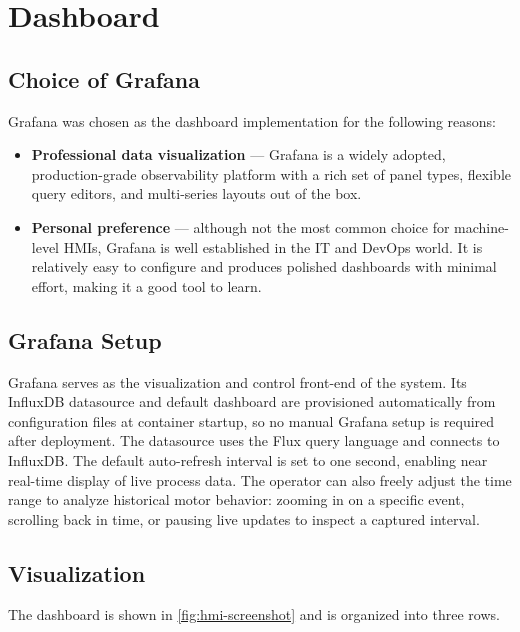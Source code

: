 \documentclass[a4paper,11pt]{article}
\begin{document}
\section{Dashboard}
\label{sec:dashboard}

\subsection{Choice of Grafana}

Grafana was chosen as the dashboard implementation for the following reasons:

\begin{itemize}
    \item \textbf{Professional data visualization} --- Grafana is a widely adopted, production-grade
    observability platform with a rich set of panel types, flexible query editors, and multi-series
    layouts out of the box.
    \item \textbf{Personal preference} --- although not the most common choice for machine-level
    HMIs, Grafana is well established in the IT and DevOps world. It is relatively easy to
    configure and produces polished dashboards with minimal effort, making it a good tool to learn.
\end{itemize}

\subsection{Grafana Setup}

Grafana serves as the visualization and control front-end of the system. Its InfluxDB datasource
and default dashboard are provisioned automatically from configuration files at container startup,
so no manual Grafana setup is required after deployment. The datasource uses the Flux query
language and connects to InfluxDB. The default auto-refresh interval is set to one second, enabling
near real-time display of live process data. The operator can also freely adjust the time range to
analyze historical motor behavior: zooming in on a specific event, scrolling back in time, or
pausing live updates to inspect a captured interval.

\subsection{Visualization}

The dashboard is shown in \autoref{fig:hmi-screenshot} and is organized into three rows.
\end{document}
